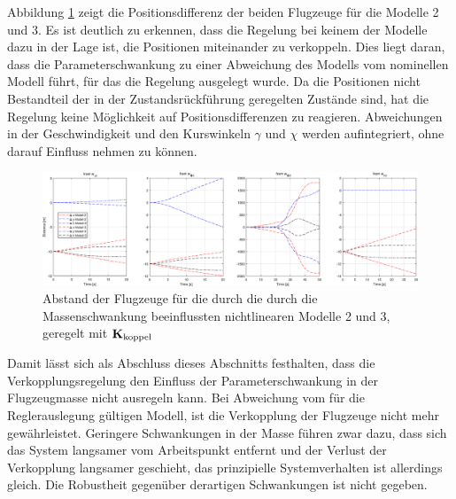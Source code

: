 Abbildung \ref{fig:distance_xyz_nlinear_twomassmodels} zeigt die Positionsdifferenz der beiden Flugzeuge für die Modelle 2 und 3. Es ist deutlich zu erkennen, dass die Regelung bei keinem der Modelle dazu in der Lage ist, die Positionen miteinander zu verkoppeln. Dies liegt daran, dass die Parameterschwankung zu einer Abweichung des Modells vom nominellen Modell führt, für das die Regelung ausgelegt wurde. Da die Positionen nicht Bestandteil der in der Zustandsrückführung geregelten Zustände sind, hat die Regelung keine Möglichkeit auf Positionsdifferenzen zu reagieren. Abweichungen in der Geschwindigkeit und den Kurswinkeln $\gamma$ und $\chi$ werden aufintegriert, ohne darauf Einfluss nehmen zu können. 
\begin{figure}[H] %
	\centering
	\includegraphics[width=\linewidth]{./Bilder/distance_xyz_nlinear_twomassmodels.eps}
	\caption{Abstand der Flugzeuge für die durch die durch die Massenschwankung beeinflussten nichtlinearen Modelle 2 und 3, geregelt mit ${\boldsymbol{\mathrm{K}}}_{\textnormal{koppel}}$}
	\label{fig:distance_xyz_nlinear_twomassmodels}
\end{figure}
Damit lässt sich als Abschluss dieses Abschnitts festhalten, dass die Verkopplungsregelung den Einfluss der Parameterschwankung in der Flugzeugmasse nicht ausregeln kann. Bei Abweichung vom für die Reglerauslegung gültigen Modell, ist die Verkopplung der Flugzeuge nicht mehr gewährleistet. Geringere Schwankungen in der Masse führen zwar dazu, dass sich das System langsamer vom Arbeitspunkt entfernt und der Verlust der Verkopplung langsamer geschieht, das prinzipielle Systemverhalten ist allerdings gleich. Die Robustheit gegenüber derartigen Schwankungen ist nicht gegeben. 

